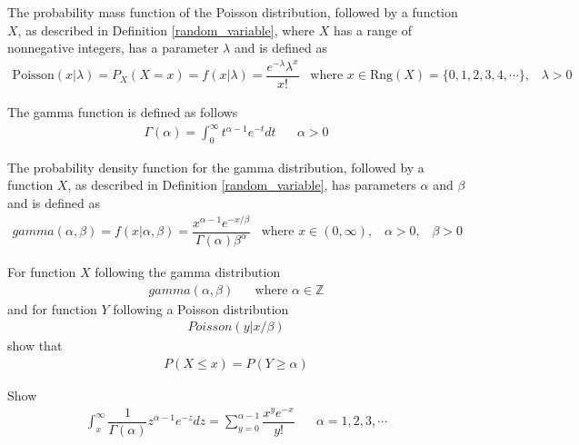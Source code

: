 \begin{definition}
The probability mass function of the Poisson distribution, followed by a function $X$, as described in Definition \ref{random_variable}, where $X$ has a range of nonnegative integers, has a parameter $\lambda$ and is defined as
\begin{align*}
    \text{Poisson}(x | \lambda) = P_{X}(X = x) = f(x | \lambda) =  \dfrac{e^{-\lambda} \lambda^{x}}{x!} \hspace{10pt} \text{where} \hspace{4pt} x \in \text{Rng}(X) = \{0, 1, 2, 3, 4, \cdots\}, \hspace{10pt} \lambda > 0
\end{align*}
\end{definition}

\begin{definition}
The gamma function is defined as follows
\begin{align*}
    \Gamma(\alpha) = \int_{0}^{\infty} t^{\alpha - 1} e^{-t} dt \hspace{20pt} \alpha > 0 
\end{align*}
\end{definition}

\begin{definition}
The probability density function for the gamma distribution, followed by a function $X$, as described in Definition \ref{random_variable}, has parameters $\alpha$ and $\beta$ and is defined as 
\begin{align*}
    gamma(\alpha, \beta) = f(x | \alpha, \beta) = \dfrac{x^{\alpha - 1} e^{-x/\beta}}{\Gamma(\alpha)\beta^{\alpha}} \hspace{10pt} \text{where} \hspace{4pt} x \in (0, \infty), \hspace{10pt} \alpha > 0, \hspace{10pt} \beta > 0
\end{align*}
\end{definition}

\begin{exercise}
For function $X$ following the gamma distribution 
\begin{align*}
    gamma(\alpha, \beta) \hspace{20pt} \text{where} \hspace{4pt} \alpha \in \mathbb{Z}
\end{align*}
and for function $Y$ following a Poisson distribution
\begin{align*}
    Poisson(y | x/\beta)
\end{align*}
show that
\begin{align*}
    P(X \leq x) = P(Y \geq \alpha)
\end{align*}
\end{exercise}

\begin{exercise}
Show
\begin{align*}
    \int_{x}^{\infty} \dfrac{1}{\Gamma(\alpha)} z^{\alpha - 1} e^{-z} dz = \sum_{y = 0}^{\alpha - 1} \dfrac{x^{y} e^{-x}}{y!} \hspace{20pt} \alpha = 1, 2, 3, \cdots
\end{align*}
\end{exercise}